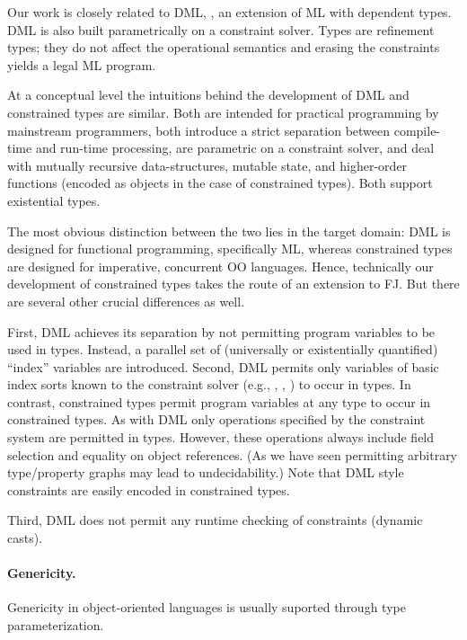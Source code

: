 Our work is closely related to DML, \cite{xi99dependent}, an
extension of ML with dependent types. DML is also built
parametrically on a constraint solver. Types are refinement types;
they do not affect the operational semantics and erasing the
constraints yields a legal ML program.

At a conceptual level the intuitions behind the development of DML
and constrained types are similar. Both are intended for practical
programming by mainstream programmers, both introduce a strict
separation between compile-time and run-time processing, are
parametric on a constraint solver, and deal with mutually recursive
data-structures, mutable state, and higher-order functions (encoded as
objects in the case of constrained types). Both support existential
types.

The most obvious distinction between the two lies in the target
domain: DML is designed for functional programming, specifically
ML, whereas constrained types are designed for imperative, concurrent
OO languages. Hence, technically our development of constrained types
takes the route of an extension to FJ. But there are several other
crucial differences as well.

First, DML achieves its separation by not permitting program
variables to be used in types. Instead, a parallel set of (universally
or existentially quantified) ``index'' variables are
introduced.
Second, DML permits only variables of basic index sorts known to
the constraint solver (e.g., , , ) to
occur in types. In contrast, constrained types permit program
variables at any type to occur in constrained types. As with DML
only operations specified by the constraint system are permitted in
types. However, these operations always include field selection and
equality on object references.  (As we have seen permitting arbitrary
type/property graphs may lead to undecidability.) Note that DML
style constraints are easily encoded in constrained types.

Third, DML does not permit any runtime checking of constraints
(dynamic casts).

\paragraph{Genericity.}

Genericity in object-oriented languages is usually
suported through
type parameterization.

